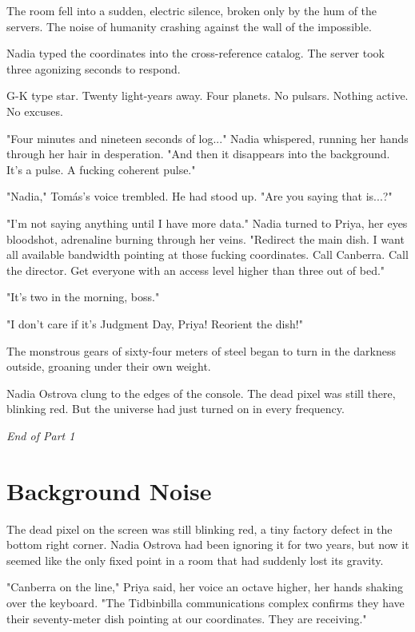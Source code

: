 \documentclass[11pt,a5paper,twoside]{book}
\begin{document}
The room fell into a sudden, electric silence, broken only by the hum of the servers. The noise of humanity crashing against the wall of the impossible.

Nadia typed the coordinates into the cross-reference catalog. The server took three agonizing seconds to respond.

G-K type star. Twenty light-years away. Four planets. No pulsars. Nothing active. No excuses.

"Four minutes and nineteen seconds of log..." Nadia whispered, running her hands through her hair in desperation. "And then it disappears into the background. It's a pulse. A fucking coherent pulse."

"Nadia," Tomás's voice trembled. He had stood up. "Are you saying that is...?"

"I'm not saying anything until I have more data." Nadia turned to Priya, her eyes bloodshot, adrenaline burning through her veins. "Redirect the main dish. I want all available bandwidth pointing at those fucking coordinates. Call Canberra. Call the director. Get everyone with an access level higher than three out of bed."

"It's two in the morning, boss."

"I don't care if it's Judgment Day, Priya! Reorient the dish!"

The monstrous gears of sixty-four meters of steel began to turn in the darkness outside, groaning under their own weight.

Nadia Ostrova clung to the edges of the console. The dead pixel was still there, blinking red. But the universe had just turned on in every frequency.

\textit{End of Part 1}

\chapter{Background Noise}

The dead pixel on the screen was still blinking red, a tiny factory defect in the bottom right corner. Nadia Ostrova had been ignoring it for two years, but now it seemed like the only fixed point in a room that had suddenly lost its gravity.

"Canberra on the line," Priya said, her voice an octave higher, her hands shaking over the keyboard. "The Tidbinbilla communications complex confirms they have their seventy-meter dish pointing at our coordinates. They are receiving."
\end{document}
